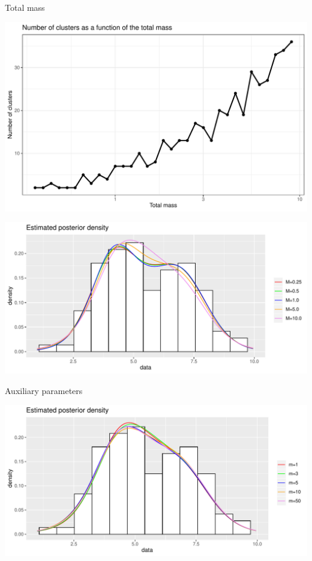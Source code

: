 \begin{frame}{Total mass}

\begin{center}
		\includegraphics[scale=0.35]{etc/num_clust_M.pdf}
	\end{center}


\begin{center}
		\includegraphics[scale=0.35]{etc/dens_withMm3.pdf}
	\end{center}
\end{frame}



\begin{frame}{Auxiliary parameters}

\begin{center}
		\includegraphics[scale=0.5]{etc/dens_withmM10.pdf}
	\end{center}
\end{frame}



